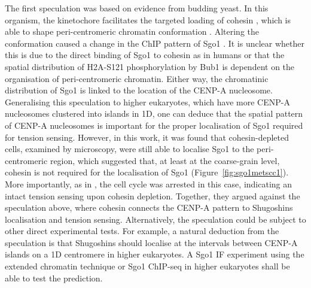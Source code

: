 The first speculation was based on evidence from budding yeast. In this organism, the kinetochore facilitates the targeted loading of cohesin \citep{Hinshaw2015StructuralLoading, Hinshaw2017TheComplex, Fernius2009EstablishmentCsm3, Fernius2013Cohesin-DependentEstablishment, Natsume2013KinetochoresRecruitment}, which is able to shape peri-centromeric chromatin conformation \citep{Paldi2020ConvergentPericentromeres}. Altering the conformation caused a change in the ChIP pattern of Sgo1 \citep{Paldi2020ConvergentPericentromeres}. It is unclear whether this is due to the direct binding of Sgo1 to cohesin as in humans \citep{Liu2013, Hara2014, Garcia-Nieto2023StructuralProtection} or that the spatial distribution of H2A-S121 phosphorylation by Bub1 is dependent on the organisation of peri-centromeric chromatin. Either way, the chromatinic distribution of Sgo1 is linked to the location of the CENP-A nucleosome. Generalising this speculation to higher eukaryotes, which have more CENP-A nucleosomes clustered into islands in 1D, one can deduce that the spatial pattern of CENP-A nucleosomes is important for the proper localisation of Sgo1 required for tension sensing. However, in this work, it was found that cohesin-depleted cells, examined by microscopy, were still able to localise Sgo1 to the peri-centromeric region, which suggested that, at least at the coarse-grain level, cohesin is not required for the localisation of Sgo1 (Figure~\ref{fig:sgo1metscc1}). More importantly, as in \cite{Indjeian2005a}, the cell cycle was arrested in this case, indicating an intact tension sensing upon cohesin depletion. Together, they argued against the speculation above, where cohesin connects the CENP-A pattern to Shugoshins localisation and tension sensing. Alternatively, the speculation could be subject to other direct experimental tests. For example, a natural deduction from the speculation is that Shugoshins should localise at the intervals between CENP-A islands on a 1D centromere in higher eukaryotes. A Sgo1 IF experiment using the extended chromatin technique \citep{Blower2002ConservedHumans, Dunleavy2011H3.3Phase., Kyriacou2018} or Sgo1 ChIP-seq in higher eukaryotes shall be able to test the prediction. 

